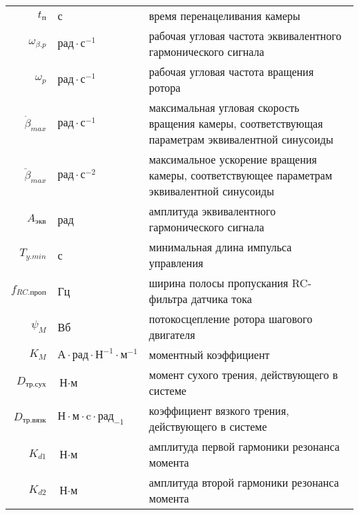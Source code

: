 \begin{table}[ht!]
\begin{tabular}{rll}
    $t_\text{п}$        & с & время перенацеливания камеры \\

    $\omega_{\beta.p}$  & $ \text{рад} \cdot \text{с}^{-1} $ & рабочая угловая
                            частота эквивалентного гармонического сигнала \\

    $\omega_{p}$        & $ \text{рад} \cdot \text{с}^{-1} $ & рабочая угловая
                            частота вращения ротора \\

    $\dot{\beta}_{max}$  & $\text{рад} \cdot \text{с}^{-1}$ & максимальная угловая скорость вращения камеры,
                            соответствующая параметрам эквивалентной синусоиды \\

    $\ddot{\beta}_{max}$ & $ \text{рад} \cdot \text{с}^{-2} $ & максимальное ускорение
                            вращения камеры, соответствующее параметрам эквивалентной синусоиды \\

    $A_{\text{экв}}$     & рад & амплитуда эквивалентного гармонического сигнала \\

    $T_{y.min}$          & с & минимальная длина импульса управления \\

    $f_{RC.\text{проп}}$ & Гц & ширина полосы пропускания RC-фильтра датчика тока \\

    $\psi_{M}$           & Вб & потокосцепление ротора шагового двигателя \\

    $K_{M}$              & $\text{А} \cdot \text{рад} \cdot \text{Н}^{-1} \cdot \text{м}^{-1}$ & моментный коэффициент \\

    $D_{\text{тр.сух}}$  & $\text{Н} \cdot \text{м}$ & момент сухого трения, действующего в системе \\

    $D_{\text{тр.вязк}}$  & $\text{Н} \cdot \text{м} \cdot \text{c} \cdot \text{рад}_{-1}$ & коэффициент вязкого трения, действующего в системе \\

    $K_{d1}$             & $\text{Н} \cdot \text{м}$ & амплитуда первой гармоники резонанса момента \\

    $K_{d2}$             & $\text{Н} \cdot \text{м}$ & амплитуда второй гармоники резонанса момента \\


\end{tabular}
\end{table}
